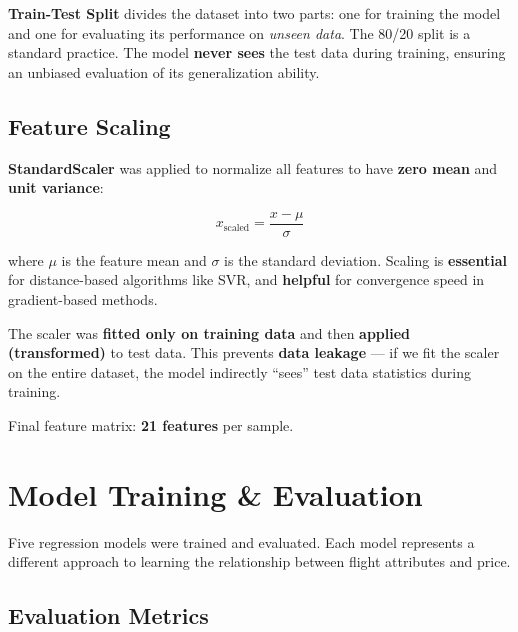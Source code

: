 \documentclass[12pt, a4paper]{article}
\begin{document}
\begin{keyterm}
\textbf{Train-Test Split} divides the dataset into two parts: one for training the model and one for evaluating its performance on \textit{unseen data}. The 80/20 split is a standard practice. The model \textbf{never sees} the test data during training, ensuring an unbiased evaluation of its generalization ability.
\end{keyterm}

\subsection{Feature Scaling}

\textbf{StandardScaler} was applied to normalize all features to have \textbf{zero mean} and \textbf{unit variance}:

\[
    x_{\text{scaled}} = \frac{x - \mu}{\sigma}
\]

where $\mu$ is the feature mean and $\sigma$ is the standard deviation. Scaling is \textbf{essential} for distance-based algorithms like SVR, and \textbf{helpful} for convergence speed in gradient-based methods.

\begin{importantbox}
The scaler was \textbf{fitted only on training data} and then \textbf{applied (transformed)} to test data. This prevents \textbf{data leakage} — if we fit the scaler on the entire dataset, the model indirectly ``sees'' test data statistics during training.
\end{importantbox}

Final feature matrix: \textbf{21 features} per sample.

\newpage

\section{Model Training \& Evaluation}

Five regression models were trained and evaluated. Each model represents a different approach to learning the relationship between flight attributes and price.

\subsection{Evaluation Metrics}
\end{document}
